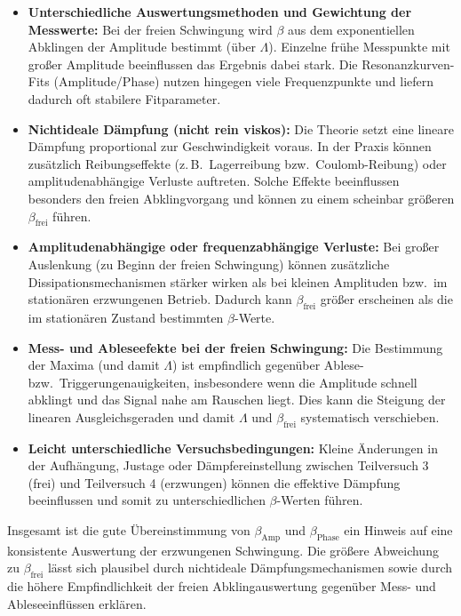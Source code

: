 \documentclass{report}
\begin{document}
\begin{itemize}
    \item \textbf{Unterschiedliche Auswertungsmethoden und Gewichtung der Messwerte:}
    Bei der freien Schwingung wird $\beta$ aus dem exponentiellen Abklingen der Amplitude bestimmt (über $\Lambda$). Einzelne frühe Messpunkte mit großer Amplitude beeinflussen das Ergebnis dabei stark. Die Resonanzkurven-Fits (Amplitude/Phase) nutzen hingegen viele Frequenzpunkte und liefern dadurch oft stabilere Fitparameter.
    
    \item \textbf{Nichtideale Dämpfung (nicht rein viskos):}
    Die Theorie setzt eine lineare Dämpfung proportional zur Geschwindigkeit voraus. In der Praxis können zusätzlich Reibungseffekte (z.\,B.\ Lagerreibung bzw.\ Coulomb-Reibung) oder amplitudenabhängige Verluste auftreten. Solche Effekte beeinflussen besonders den freien Abklingvorgang und können zu einem scheinbar größeren $\beta_{\text{frei}}$ führen.
    
    \item \textbf{Amplitudenabhängige oder frequenzabhängige Verluste:}
    Bei großer Auslenkung (zu Beginn der freien Schwingung) können zusätzliche Dissipationsmechanismen stärker wirken als bei kleinen Amplituden bzw.\ im stationären erzwungenen Betrieb. Dadurch kann $\beta_{\text{frei}}$ größer erscheinen als die im stationären Zustand bestimmten $\beta$-Werte.
    
    \item \textbf{Mess- und Ableseefekte bei der freien Schwingung:}
    Die Bestimmung der Maxima (und damit $\Lambda$) ist empfindlich gegenüber Ablese- bzw.\ Triggerungenauigkeiten, insbesondere wenn die Amplitude schnell abklingt und das Signal nahe am Rauschen liegt. Dies kann die Steigung der linearen Ausgleichsgeraden und damit $\Lambda$ und $\beta_{\text{frei}}$ systematisch verschieben.
    
    \item \textbf{Leicht unterschiedliche Versuchsbedingungen:}
    Kleine Änderungen in der Aufhängung, Justage oder Dämpfereinstellung zwischen Teilversuch 3 (frei) und Teilversuch 4 (erzwungen) können die effektive Dämpfung beeinflussen und somit zu unterschiedlichen $\beta$-Werten führen.
\end{itemize}

Insgesamt ist die gute Übereinstimmung von $\beta_{\text{Amp}}$ und $\beta_{\text{Phase}}$ ein Hinweis auf eine konsistente Auswertung der erzwungenen Schwingung. Die größere Abweichung zu $\beta_{\text{frei}}$ lässt sich plausibel durch nichtideale Dämpfungsmechanismen sowie durch die höhere Empfindlichkeit der freien Abklingauswertung gegenüber Mess- und Ableseeinflüssen erklären.
\end{document}
